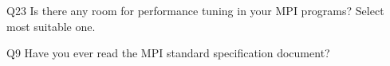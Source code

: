 \begin{description}%
\item{Q23} Is there any room for performance tuning in your MPI programs? Select most suitable one.%
\item{Q9} Have you ever read the MPI standard specification document?%
\end{description}%
